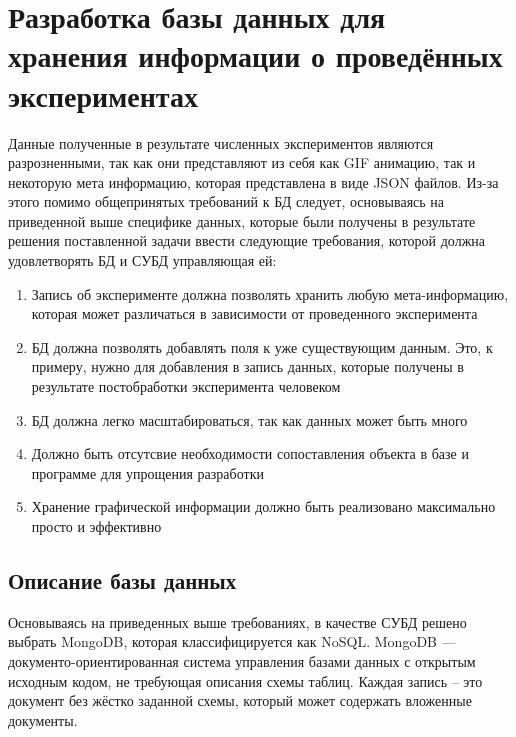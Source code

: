 \documentclass[14pt]{extreport}
\begin{document}
\chapter{Разработка базы данных для хранения информации о проведённых экспериментах}

Данные полученные в результате численных экспериментов являются разрозненными, так как они представляют из себя как GIF анимацию, так и некоторую мета информацию, которая представлена в виде JSON файлов. Из-за этого помимо общепринятых требований к БД следует, основываясь на приведенной выше специфике данных, которые были получены в результате решения поставленной задачи ввести следующие требования, которой должна удовлетворять БД и СУБД управляющая ей:

\begin{enumerate}

\item Запись об эксперименте должна позволять хранить любую мета-информацию, которая может различаться в зависимости от проведенного эксперимента

\item БД должна позволять добавлять поля к уже существующим данным. Это, к примеру, нужно для добавления в запись данных, которые получены в результате постобработки эксперимента человеком

\item БД должна легко масштабироваться, так как данных может быть много

\item Должно быть отсутсвие необходимости сопоставления объекта в базе и программе для упрощения разработки

\item Хранение графической информации должно быть реализовано максимально просто и эффективно

\end{enumerate}

\section{Описание базы данных}

Основываясь на приведенных выше требованиях, в качестве СУБД решено выбрать MongoDB, которая классифицируется как NoSQL. MongoDB — документо-ориентированная система управления базами данных с открытым исходным кодом, не требующая описания схемы таблиц. Каждая запись – это документ без жёстко заданной схемы, который может содержать вложенные документы.
\end{document}
